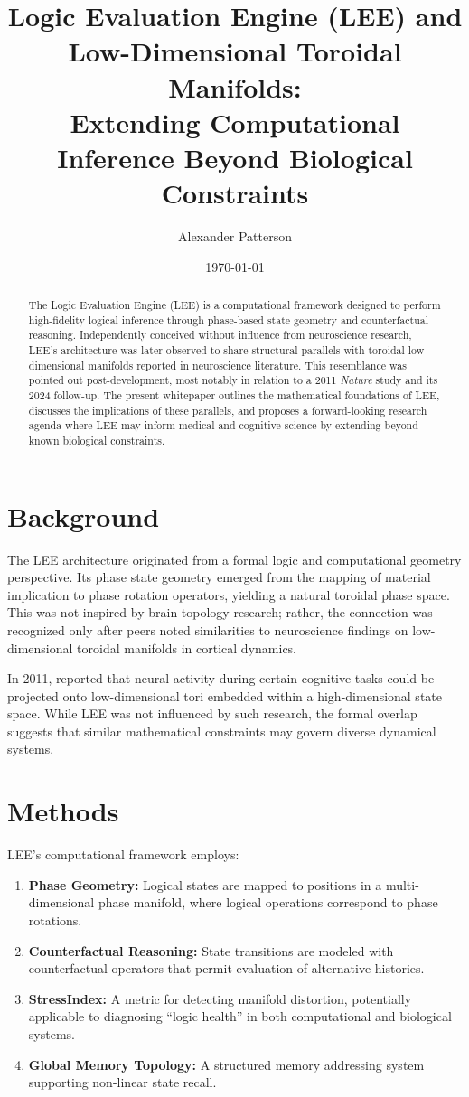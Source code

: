 \documentclass[12pt]{article}
\title{Logic Evaluation Engine (LEE) and Low-Dimensional Toroidal Manifolds:\\
Extending Computational Inference Beyond Biological Constraints}
\author{Alexander Patterson}
\date{\today}
\begin{document}
\maketitle

\begin{abstract}
The Logic Evaluation Engine (LEE) is a computational framework designed to perform high-fidelity logical inference through phase-based state geometry and counterfactual reasoning. Independently conceived without influence from neuroscience research, LEE’s architecture was later observed to share structural parallels with toroidal low-dimensional manifolds reported in neuroscience literature. This resemblance was pointed out post-development, most notably in relation to a 2011 \textit{Nature} study and its 2024 follow-up. The present whitepaper outlines the mathematical foundations of LEE, discusses the implications of these parallels, and proposes a forward-looking research agenda where LEE may inform medical and cognitive science by extending beyond known biological constraints.
\end{abstract}

\section{Background}
The LEE architecture originated from a formal logic and computational geometry perspective. Its phase state geometry emerged from the mapping of material implication to phase rotation operators, yielding a natural toroidal phase space. This was not inspired by brain topology research; rather, the connection was recognized only after peers noted similarities to neuroscience findings on low-dimensional toroidal manifolds in cortical dynamics.

In 2011, \citet{Nature_2024} reported that neural activity during certain cognitive tasks could be projected onto low-dimensional tori embedded within a high-dimensional state space. While LEE was not influenced by such research, the formal overlap suggests that similar mathematical constraints may govern diverse dynamical systems.

\section{Methods}
LEE's computational framework employs:
\begin{enumerate}
    \item \textbf{Phase Geometry:} Logical states are mapped to positions in a multi-dimensional phase manifold, where logical operations correspond to phase rotations.
    \item \textbf{Counterfactual Reasoning:} State transitions are modeled with counterfactual operators that permit evaluation of alternative histories.
    \item \textbf{StressIndex:} A metric for detecting manifold distortion, potentially applicable to diagnosing “logic health” in both computational and biological systems.
    \item \textbf{Global Memory Topology:} A structured memory addressing system supporting non-linear state recall.
\end{enumerate}
\end{document}
